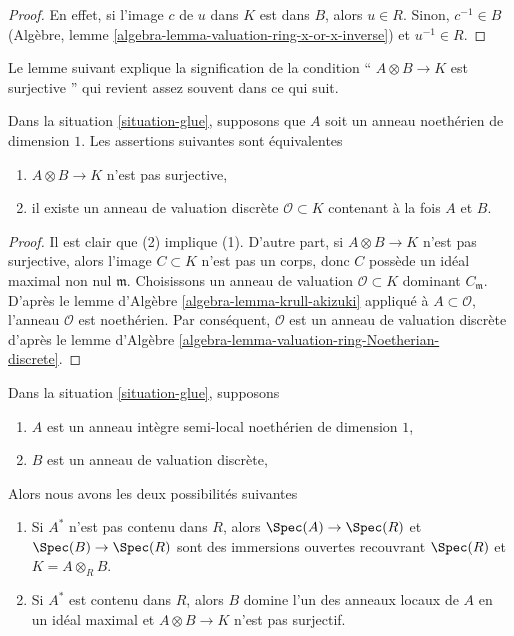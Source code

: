 \begin{proof}
En effet, si l'image $c$ de $u$ dans $K$ est
dans $B$, alors $u \in R$. Sinon, $c^{-1} \in
B$ (Algèbre, lemme
\ref{algebra-lemma-valuation-ring-x-or-x-inverse}) et $u^{-1} \in R$.
\end{proof}

\noindent
Le lemme suivant explique la signification de la
condition `` $A \otimes B \to K$ est surjective
'' qui revient assez souvent dans ce qui suit.

\begin{lemma}
\label{lemma-glue-separated}
Dans la situation \ref{situation-glue}, supposons que $A$ soit un anneau
noethérien de dimension $1$. Les assertions suivantes sont équivalentes
\begin{enumerate}
\item $A \otimes B \to K$ n'est pas surjective,
\item il existe un anneau de valuation discrète
$\mathcal{O} \subset K$ contenant à la fois $A$ et $B$.
\end{enumerate}
\end{lemma}

\begin{proof}
Il est clair que (2) implique (1). D'autre part, si $A \otimes B \to
K$ n'est pas surjective, alors l'image $C \subset K$ n'est pas un
corps, donc $C$ possède un idéal maximal non nul $\mathfrak m$.
Choisissons un anneau de valuation $\mathcal{O} \subset K$ dominant
$C_\mathfrak m$. D'après le lemme d'Algèbre
\ref{algebra-lemma-krull-akizuki} appliqué à $A \subset \mathcal{O}$, l'anneau
$\mathcal{O}$ est noethérien. Par conséquent, $\mathcal{O}$ est un anneau de valuation
discrète d'après le lemme d'Algèbre \ref{algebra-lemma-valuation-ring-Noetherian-discrete}.
\end{proof}

\begin{lemma}
\label{lemma-semi-local}
Dans la situation \ref{situation-glue}, supposons
\begin{enumerate}
\item $A$ est un anneau intègre semi-local noethérien de
dimension $1$, \item $B$ est un anneau de valuation discrète,
\end{enumerate}
Alors nous avons les deux possibilités suivantes
\begin{enumerate}
\item [(a)] Si $A^*$ n'est pas contenu dans $R$, alors
$\Spec(A) \to \Spec(R)$ et $\Spec(B) \to \Spec(R)$ sont
des immersions ouvertes recouvrant $\Spec(R)$ et $K = A
\otimes_R B$. \item [(b)] Si $A^*$ est contenu dans $R$,
alors $B$ domine l'un des anneaux locaux de $A$ en un
idéal maximal et $A \otimes B \to K$ n'est pas surjectif.
\end{enumerate}
\end{lemma}

